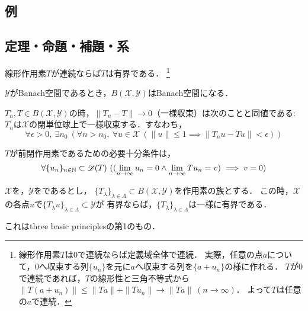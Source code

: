 \documentclass[a4j]{jarticle}
\newcommand{\dom}{\mathscr{D}}
\newcommand{\spB}[2]{B(\mathscr{#1}, \mathscr{#2})}
\newcommand{\spX}{\mathscr{X}}
\newcommand{\spY}{\mathscr{Y}}
\begin{document}
    \subsection{例}

    \subsection{定理・命題・補題・系}
    \begin{Them}[定理7.1, p.148] \label{them7:1}
        線形作用素$T$が連続ならば$T$は有界である．
        \footnote{線形作用素$T$は0で連続ならば定義域全体で連続．
        実際，任意の点$a$について，0へ収束する列$\{u_n\}$を元に$a$へ収束する列を$\{a+u_n\}$の様に作れる．
        $T$が0で連続であれば，$T$の線形性と三角不等式から$\|T(a+u_n)\| \leq \|Ta\|+\|Tu_n\| \to \|Ta\|~(n \to \infty)$．
        よって$T$は任意の$a$で連続．}
    \end{Them}

    \begin{Them}[定理7.6, p.150] \label{them7:6}
        $\spY$がBanach空間であるとき，$\spB{X}{Y}$はBanach空間になる．
    \end{Them}

    \begin{Them}[定理7.8, p.153] \label{them7:8}
        $T_n, T \in \spB{X}{Y}$の時，$\|T_n - T\| \to 0$（一様収束）は次のことと同値である:
        $T_n$は$\spX$の閉単位球上で一様収束する．すなわち，
        \[ \forall \epsilon>0,~ \exists n_0~ ( \forall n>n_0,~ \forall u \in \spX~ (\|u\| \leq 1 \implies \|T_n u - T u\|<\epsilon)) \]
    \end{Them}
    \begin{Them}[定理7.20 (i), p.166] \label{them7:20}
        $T$が前閉作用素であるための必要十分条件は，
        \[ \forall \{ u_n \}_{n \in \N} \subset \dom(T)~ ((\lim_{n \to \infty}u_n=0  \wedge \lim_{n \to \infty}Tu_n=v) \implies v=0) \]
    \end{Them}

    \begin{Them}[定理7.21, p.166, 一様有界性の原理] \label{them7:21}
        $\spX$を，$\spY$をであるとし，
        $\{ T_{\lambda} \}_{\lambda \in \Lambda} \subset \spB{X}{Y}$を作用素の族とする．
        この時，$\spX$の各点$u$で$\{ T_{\lambda}u \}_{\lambda \in \Lambda} \subset \spY$が
        有界ならば，$\{ T_{\lambda} \}_{\lambda \in \Lambda}$は一様に有界である．
    \end{Them}
    これはthree basic principlesの第1のもの．
\end{document}
